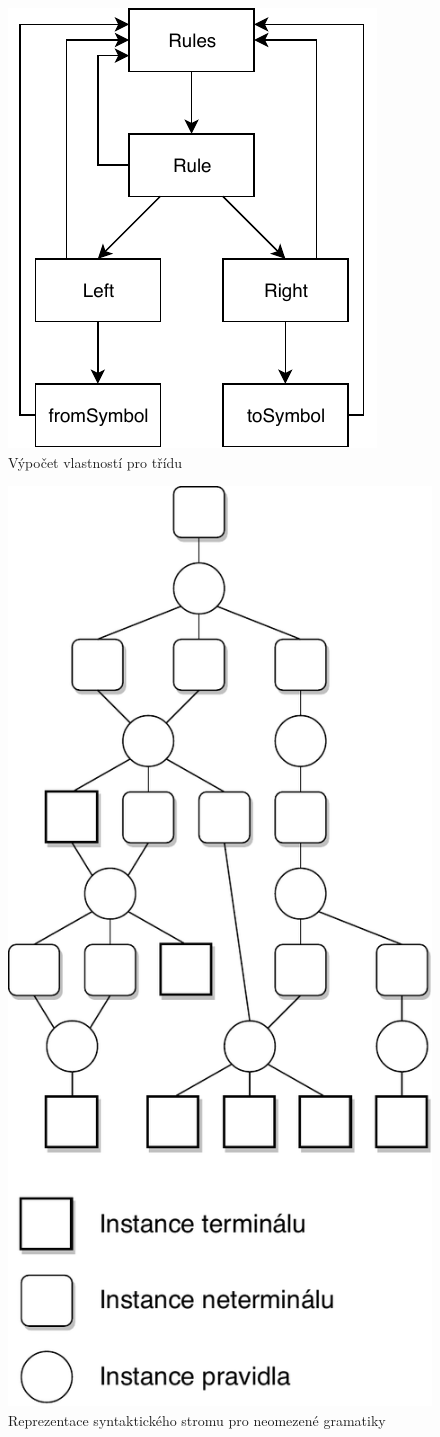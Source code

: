 	\begin{figure}				
		\centering
		\includegraphics[width=0.4\linewidth]{img/RuleComputing}
		\caption{Výpočet vlastností pro třídu }
		\label{fig:ruleComputing}
	\end{figure}

	\begin{figure}				
		\centering
		\includegraphics[width=0.6\linewidth]{img/Type0parsing}
		\caption{Reprezentace syntaktického stromu pro neomezené gramatiky}
		\label{fig:type0Parsing}
	\end{figure}

